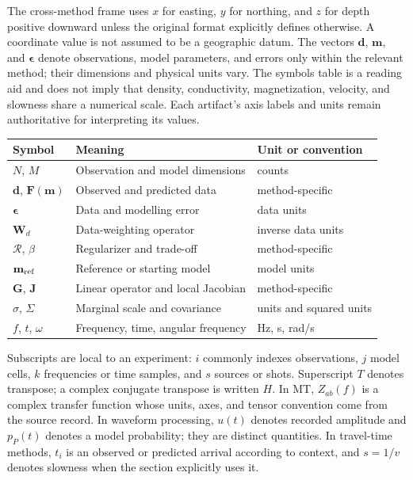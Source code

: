 The cross-method frame uses $x$ for easting, $y$ for northing, and $z$
for depth positive downward unless the original format explicitly
defines otherwise. A coordinate value is not assumed to be a geographic
datum. The vectors $\mathbf d$, $\mathbf m$, and
$\boldsymbol\epsilon$ denote observations, model parameters, and errors
only within the relevant method; their dimensions and physical units
vary. The symbols table is a reading aid and does not imply that
density, conductivity, magnetization, velocity, and slowness share a
numerical scale. Each artifact's axis labels and units remain
authoritative for interpreting its values.

\begin{center}\small
\begin{tabular}{@{}lll@{}}
\toprule
Symbol & Meaning & Unit or convention\\
\midrule
$N$, $M$ & Observation and model dimensions & counts\\
$\mathbf d$, $\mathbf F(\mathbf m)$ & Observed and predicted data & method-specific\\
$\boldsymbol\epsilon$ & Data and modelling error & data units\\
$\mathbf W_d$ & Data-weighting operator & inverse data units\\
$\mathcal R$, $\beta$ & Regularizer and trade-off & method-specific\\
$\mathbf m_{\rm ref}$ & Reference or starting model & model units\\
$\mathbf G$, $\mathbf J$ & Linear operator and local Jacobian & method-specific\\
$\sigma$, $\Sigma$ & Marginal scale and covariance & units and squared units\\
$f$, $t$, $\omega$ & Frequency, time, angular frequency & Hz, s, rad/s\\
\bottomrule
\end{tabular}
\end{center}

Subscripts are local to an experiment: $i$ commonly indexes
observations, $j$ model cells, $k$ frequencies or time samples, and
$s$ sources or shots. Superscript $T$ denotes transpose; a complex
conjugate transpose is written $H$. In MT, $Z_{ab}(f)$ is a complex
transfer function whose units, axes, and tensor convention come from
the source record. In waveform processing, $u(t)$ denotes recorded
amplitude and $p_P(t)$ denotes a model probability; they are distinct
quantities. In travel-time methods, $t_i$ is an observed or predicted
arrival according to context, and $s=1/v$ denotes slowness when the
section explicitly uses it.

